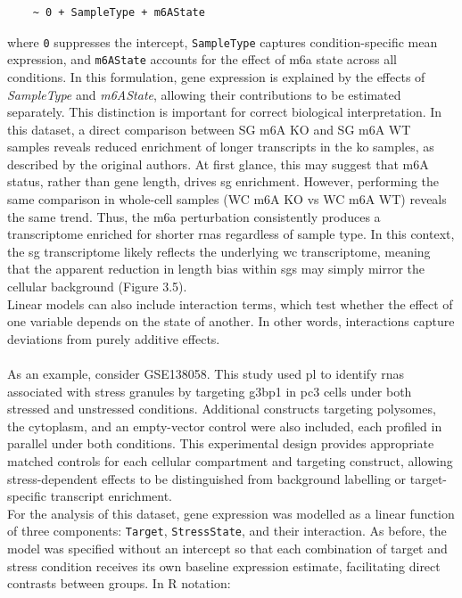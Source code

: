 \begin{verbatim}
	~ 0 + SampleType + m6AState
\end{verbatim}
where \texttt{0} suppresses the intercept, \texttt{SampleType} captures condition-specific mean expression, and \texttt{m6AState} accounts for the effect of \gls{m6a} state across all conditions.
In this formulation, gene expression is explained by the effects of \textit{SampleType} and \textit{m6AState}, allowing their contributions to be estimated separately. This distinction is important for correct biological interpretation. In this dataset, a direct comparison between SG m6A KO and SG m6A WT samples reveals reduced enrichment of longer transcripts in the \gls{ko} samples, as described by the original authors\cite{di_timoteo_m6a_2024}. At first glance, this may suggest that m6A status, rather than gene length, drives \gls{sg} enrichment. However, performing the same comparison in whole-cell samples (WC m6A KO vs WC m6A WT) reveals the same trend. Thus, the \gls{m6a} perturbation consistently produces a transcriptome enriched for shorter \glspl{rna} regardless of sample type. In this context, the \gls{sg} transcriptome likely reflects the underlying \gls{wc} transcriptome, meaning that the apparent reduction in length bias within \glspl{sg} may simply mirror the cellular background (Figure 3.5). 
\\
\linebreak
\noindent
Linear models can also include interaction terms, which test whether the effect of one variable depends on the state of another. In other words, interactions capture deviations from purely additive effects.
\\
\\
As an example, consider GSE138058\cite{somasekharan_g3bp1-linked_2020}. This study used \gls{pl} to identify \glspl{rna} associated with stress granules by targeting \gls{g3bp1} in \gls{pc3} cells under both stressed and unstressed conditions. Additional constructs targeting polysomes, the cytoplasm, and an empty-vector control were also included, each profiled in parallel under both conditions. This experimental design provides appropriate matched controls for each cellular compartment and targeting construct, allowing stress-dependent effects to be distinguished from background labelling or target-specific transcript enrichment.
\\
\linebreak
\noindent
For the analysis of this dataset, gene expression was modelled as a linear function of three components: \texttt{Target}, \texttt{StressState}, and their interaction. As before, the model was specified without an intercept so that each combination of target and stress condition receives its own baseline expression estimate, facilitating direct contrasts between groups. In R notation: 
